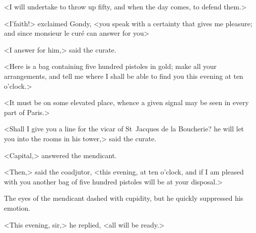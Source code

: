 <I will undertake to throw up fifty, and when the day comes, to defend them.>

<I'faith!> exclaimed Gondy, <you speak with a certainty that gives me pleasure; and since monsieur le curé can answer for you\longdash>

<I answer for him,> said the curate.

<Here is a bag containing five hundred pistoles in gold; make all your arrangements, and tell me where I shall be able to find you this evening at ten o'clock.>

<It must be on some elevated place, whence a given signal may be seen in every part of Paris.>

<Shall I give you a line for the vicar of St~Jacques de la Boucherie? he will let you into the rooms in his tower,> said the curate.

<Capital,> answered the mendicant.

<Then,> said the coadjutor, <this evening, at ten o'clock, and if I am pleased with you another bag of five hundred pistoles will be at your disposal.>

The eyes of the mendicant dashed with cupidity, but he quickly suppressed his emotion.

<This evening, sir,> he replied, <all will be ready.> 